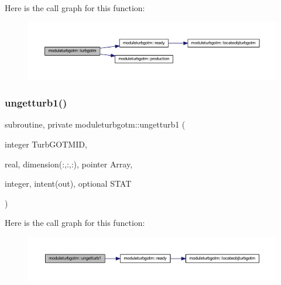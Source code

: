 Here is the call graph for this function\+:\nopagebreak
\begin{figure}[H]
\begin{center}
\leavevmode
\includegraphics[width=350pt]{namespacemoduleturbgotm_ab0d8f0e83e75ef88108e4b2bf04543c0_cgraph}
\end{center}
\end{figure}
\mbox{\label{namespacemoduleturbgotm_ab21e7a83e00f82db5a1c214bd784426a}} 
\subsubsection{\texorpdfstring{ungetturb1()}{ungetturb1()}}
{\footnotesize\ttfamily subroutine, private moduleturbgotm\+::ungetturb1 (\begin{DoxyParamCaption}\item[{integer}]{Turb\+G\+O\+T\+M\+ID,  }\item[{real, dimension(\+:,\+:,\+:), pointer}]{Array,  }\item[{integer, intent(out), optional}]{S\+T\+AT }\end{DoxyParamCaption})\hspace{0.3cm}{\ttfamily [private]}}

Here is the call graph for this function\+:\nopagebreak
\begin{figure}[H]
\begin{center}
\leavevmode
\includegraphics[width=350pt]{namespacemoduleturbgotm_ab21e7a83e00f82db5a1c214bd784426a_cgraph}
\end{center}
\end{figure}
\mbox{\label{namespacemoduleturbgotm_a4858630313fbbb17b65257d59f9e67ca}} 
